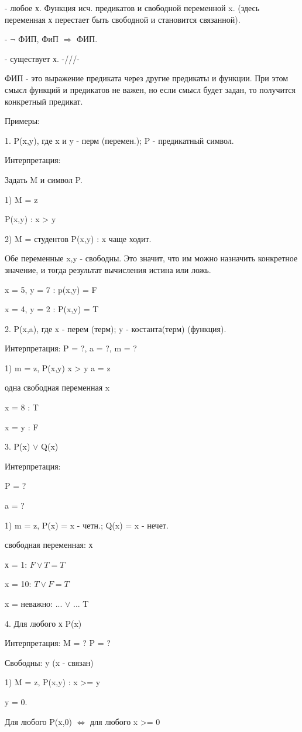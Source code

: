 \documentclass{article}
\begin{document}
- любое х. Функция исч. предикатов и свободной переменной x. (здесь переменная х перестает быть свободной и становится связанной).

- $\neg$ ФИП, ФиП $\Longrightarrow$ ФИП.

- существует х. -///-

ФИП - это выражение предиката через другие предикаты и функции. При этом смысл функций и предикатов не важен, но если смысл будет задан, то получится конкретный предикат.

Примеры:

1. P(x,y), где x и y - перм (перемен.); P - предикатный символ.

Интерпретация:

Задать M и символ P.

1) M = z

P(x,y) : x > y

2) M = студентов P(x,y) : x чаще ходит.

Обе переменные x,y - свободны. Это значит, что им можно назначить конкретное значение, и тогда результат вычисления истина или ложь.

x = 5, y = 7 : p(x,y) = F

x = 4, y = 2 : P(x,y) = T

2. P(x,a), где x - перем (терм); y - костанта(терм) (функция).

Интерпретация: P = ?, a = ?, m = ?

1) m = z, P(x,y) x > y a = z

одна свободная переменная x

x = 8 : T

x = y : F

3. P(x) $\vee$ Q(x)

Интерпретация:

P = ?

a = ?

1) m = z, P(x) = x - четн.; Q(x) = x - нечет.

свободная переменная: х

х = 1: $F \vee T = T$

x = 10: $T \vee F = T$

x = неважно: ... $\vee$ ... T

4. Для любого х P(x)

Интерпретация: M = ? P = ?

Свободны: y (x - связан)

1) M = z, P(x,y) : x >= y

y = 0.

Для любого P(x,0) $\Longleftrightarrow$ для любого x >= 0
\end{document}
